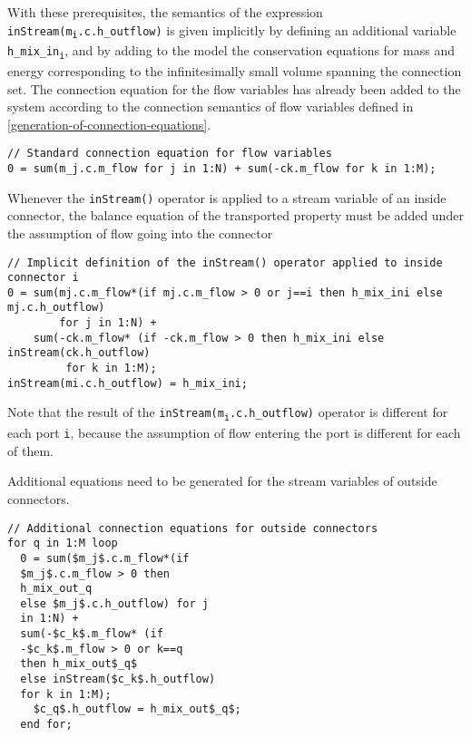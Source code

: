 With these prerequisites, the semantics of the expression
\texttt{inStream(m\textsubscript i.c.h\_outflow)} is given implicitly by
defining an additional variable \texttt{h\_mix\_in\textsubscript{i}}, and by
adding to the model the conservation equations for mass and energy
corresponding to the infinitesimally small volume spanning the
connection set. The connection equation for the flow variables has
already been added to the system according to the connection semantics
of flow variables defined in \autoref{generation-of-connection-equations}.

\begin{lstlisting}[language=modelica,mathescape=true]
// Standard connection equation for flow variables
0 = sum(m_j.c.m_flow for j in 1:N) + sum(-ck.m_flow for k in 1:M);
\end{lstlisting}

Whenever the \lstinline!inStream()! operator is applied to a stream
variable of an inside connector, the balance equation of the transported
property must be added under the assumption of flow going into the
connector

\begin{lstlisting}[language=modelica]
// Implicit definition of the inStream() operator applied to inside connector i
0 = sum(mj.c.m_flow*(if mj.c.m_flow > 0 or j==i then h_mix_ini else mj.c.h_outflow)
        for j in 1:N) +
    sum(-ck.m_flow* (if -ck.m_flow > 0 then h_mix_ini else inStream(ck.h_outflow)
         for k in 1:M);
inStream(mi.c.h_outflow) = h_mix_ini;
\end{lstlisting}

Note that the result of the
\texttt{inStream(m\textsubscript{i}.c.h\_outflow)} operator is different
for each port \lstinline!i!, because the assumption of flow entering the port is
different for each of them.

Additional equations need to be generated for the stream variables of
outside connectors.

\begin{lstlisting}[language=modelica,mathescape=true]
// Additional connection equations for outside connectors
for q in 1:M loop
  0 = sum($m_j$.c.m_flow*(if
  $m_j$.c.m_flow > 0 then
  h_mix_out_q
  else $m_j$.c.h_outflow) for j
  in 1:N) +
  sum(-$c_k$.m_flow* (if
  -$c_k$.m_flow > 0 or k==q
  then h_mix_out$_q$
  else inStream($c_k$.h_outflow)
  for k in 1:M);
    $c_q$.h_outflow = h_mix_out$_q$;
  end for;
\end{lstlisting}

